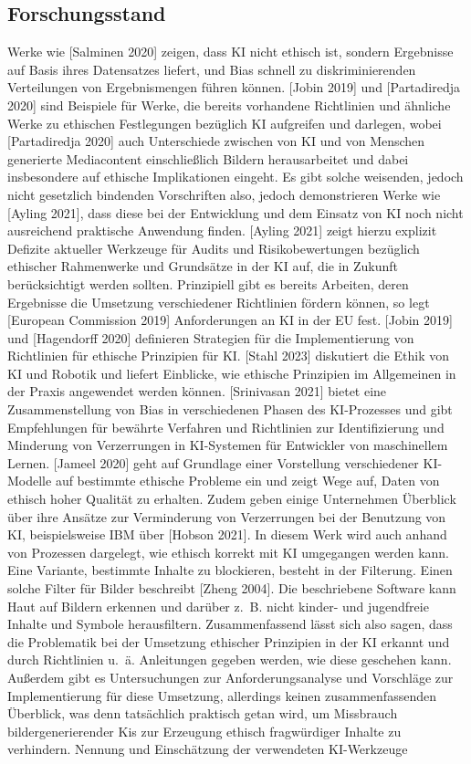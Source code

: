 \subsection{Forschungsstand}
Werke wie [Salminen 2020] zeigen, dass KI nicht ethisch ist, sondern Ergebnisse auf Basis ihres Datensatzes liefert,
und Bias schnell zu diskriminierenden Verteilungen von Ergebnismengen führen können. [Jobin 2019] und [Partadiredja 2020]
sind Beispiele für Werke, die bereits vorhandene Richtlinien und ähnliche Werke zu ethischen Festlegungen bezüglich KI 
aufgreifen und darlegen, wobei [Partadiredja 2020] auch Unterschiede zwischen von KI und von Menschen generierte 
Mediacontent einschließlich Bildern herausarbeitet und dabei insbesondere auf ethische Implikationen eingeht. 
Es gibt solche weisenden, jedoch nicht gesetzlich bindenden Vorschriften also, jedoch demonstrieren Werke wie 
[Ayling 2021], dass diese bei der Entwicklung und dem Einsatz von KI noch nicht ausreichend praktische Anwendung 
finden. [Ayling 2021] zeigt hierzu explizit Defizite aktueller Werkzeuge für Audits und Risikobewertungen bezüglich 
ethischer Rahmenwerke und Grundsätze in der KI auf, die in Zukunft berücksichtigt werden sollten. 
Prinzipiell gibt es bereits Arbeiten, deren Ergebnisse die Umsetzung verschiedener Richtlinien fördern können, so legt 
[European Commission 2019] Anforderungen an KI in der EU fest. [Jobin 2019] und [Hagendorff 2020] definieren Strategien 
für die Implementierung von Richtlinien für ethische Prinzipien für KI. [Stahl 2023] diskutiert die Ethik von KI und Robotik 
und liefert Einblicke, wie ethische Prinzipien im Allgemeinen in der Praxis angewendet werden können. [Srinivasan 2021] bietet 
eine Zusammenstellung von Bias in verschiedenen Phasen des KI-Prozesses und gibt Empfehlungen für bewährte Verfahren und 
Richtlinien zur Identifizierung und Minderung von Verzerrungen in KI-Systemen für Entwickler von maschinellem Lernen. [Jameel 2020] 
geht auf Grundlage einer Vorstellung verschiedener KI-Modelle auf bestimmte ethische Probleme ein und zeigt Wege auf, 
Daten von ethisch hoher Qualität zu erhalten.
Zudem geben einige Unternehmen Überblick über ihre Ansätze zur Verminderung von Verzerrungen bei der Benutzung von KI, 
beispielsweise IBM über [Hobson 2021]. In diesem Werk wird auch anhand von Prozessen dargelegt, wie ethisch korrekt mit KI 
umgegangen werden kann.
Eine Variante, bestimmte Inhalte zu blockieren, besteht in der Filterung. Einen solche Filter für Bilder beschreibt [Zheng 2004].
Die beschriebene Software kann Haut auf Bildern erkennen und darüber z. B. nicht kinder- und jugendfreie Inhalte und Symbole herausfiltern.
Zusammenfassend lässt sich also sagen, dass die Problematik bei der Umsetzung ethischer Prinzipien in der KI erkannt und
durch Richtlinien u. ä. Anleitungen gegeben werden, wie diese geschehen kann. Außerdem gibt es Untersuchungen 
zur Anforderungsanalyse und Vorschläge zur Implementierung für diese Umsetzung, allerdings keinen zusammenfassenden 
Überblick, was denn tatsächlich praktisch getan wird, um Missbrauch bildergenerierender Kis zur Erzeugung ethisch 
fragwürdiger Inhalte zu verhindern.
Nennung und Einschätzung der verwendeten KI-Werkzeuge

